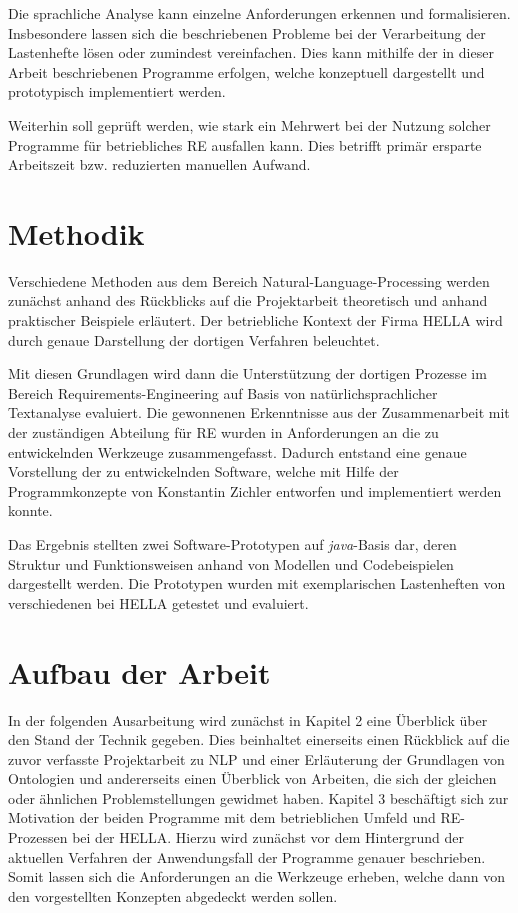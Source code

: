 \documentclass[12pt]{report}
\begin{document}
Die sprachliche Analyse kann einzelne Anforderungen erkennen und formalisieren. Insbesondere lassen sich die beschriebenen Probleme bei der Verarbeitung der Lastenhefte lösen oder zumindest vereinfachen. Dies kann mithilfe der in dieser Arbeit beschriebenen Programme erfolgen, welche konzeptuell dargestellt und prototypisch implementiert werden. 

Weiterhin soll geprüft werden, wie stark ein Mehrwert bei der Nutzung solcher Programme für betriebliches RE ausfallen kann. Dies betrifft primär ersparte Arbeitszeit bzw. reduzierten manuellen Aufwand.

\section{Methodik}
Verschiedene Methoden aus dem Bereich Natural-Language-Processing werden zunächst anhand des Rückblicks auf die Projektarbeit theoretisch und anhand praktischer Beispiele erläutert. Der betriebliche Kontext der Firma HELLA wird durch genaue Darstellung der dortigen Verfahren beleuchtet. 

Mit diesen Grundlagen wird dann die Unterstützung der dortigen Prozesse im Bereich Requirements-Engineering auf Basis von natürlichsprachlicher Textanalyse evaluiert. Die gewonnenen Erkenntnisse aus der Zusammenarbeit mit der zuständigen Abteilung für RE wurden in Anforderungen an die zu entwickelnden Werkzeuge zusammengefasst. Dadurch entstand eine genaue Vorstellung der zu entwickelnden Software, welche mit Hilfe der Programmkonzepte von Konstantin Zichler \cite{zh19} entworfen und implementiert werden konnte. 

Das Ergebnis stellten zwei Software-Prototypen auf \textit{java}-Basis dar, deren Struktur und Funktionsweisen anhand von Modellen und Codebeispielen dargestellt werden. Die Prototypen wurden mit exemplarischen Lastenheften von verschiedenen bei HELLA getestet und evaluiert.

\section{Aufbau der Arbeit}
In der folgenden Ausarbeitung wird zunächst in Kapitel 2 eine Überblick über den Stand der Technik gegeben. Dies beinhaltet einerseits einen Rückblick auf die zuvor verfasste Projektarbeit zu NLP und einer Erläuterung der Grundlagen von Ontologien und andererseits einen Überblick von Arbeiten, die sich der gleichen oder ähnlichen Problemstellungen gewidmet haben. 
Kapitel 3 beschäftigt sich zur Motivation der beiden Programme mit dem betrieblichen Umfeld und RE-Prozessen bei der HELLA. Hierzu wird zunächst vor dem Hintergrund der aktuellen Verfahren der Anwendungsfall der Programme genauer beschrieben. Somit lassen sich die Anforderungen an die Werkzeuge erheben, welche dann von den vorgestellten Konzepten abgedeckt werden sollen. 
\end{document}
